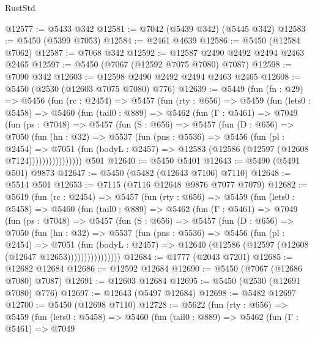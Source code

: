 \begin{lexlean}{RustStd}
\begin{coremodule}
@12577 := @5433 @342
@12581 := @7042 (@5439 @342) (@5445 @342)
@12583 := @5450 (@5399 @7053)
@12584 := @2461 @4639
@12586 := @5450 (@12584 @7062)
@12587 := @7068 @342
@12592 := @12587 @2490 @2492 @2494 @2463 @2465
@12597 := @5450 (@7067 (@12592 @7075 @7080) @7087)
@12598 := @7090 @342
@12603 := @12598 @2490 @2492 @2494 @2463 @2465
@12608 := @5450 (@2530 (@12603 @7075 @7080) @776)
@12639 := @5449
    (fun (fn : @29) =>
    @5456
      (fun (rc : @2454) =>
      @5457
        (fun (rty : @656) =>
        @5459
          (fun (lets0 : @5458) =>
          @5460
            (fun (tail0 : @889) =>
            @5462
              (fun (Γ : @5461) =>
              @7049
                (fun (ps : @7048) =>
                @5457
                  (fun (S : @656) =>
                  @5457
                    (fun (D : @656) =>
                    @7050
                      (fun (hn : @32) =>
                      @5537
                        (fun (pns : @5536) =>
                        @5456
                          (fun (pl : @2454) =>
                          @7051
                            (fun (bodyL : @2457) =>
                            @12583 (@12586 (@12597 (@12608 @7124))))))))))))))))
    @501
@12640 := @5450 @5401
@12643 := @5490 (@5491 @501) @9873
@12647 := @5450 (@5482 (@12643 @7106) @7110)
@12648 := @5514 @501
@12653 := @7115 (@7116 @12648 @9876 @7077 @7079)
@12682 := @5619
    (fun (rc : @2454) =>
    @5457
      (fun (rty : @656) =>
      @5459
        (fun (lets0 : @5458) =>
        @5460
          (fun (tail0 : @889) =>
          @5462
            (fun (Γ : @5461) =>
            @7049
              (fun (ps : @7048) =>
              @5457
                (fun (S : @656) =>
                @5457
                  (fun (D : @656) =>
                  @7050
                    (fun (hn : @32) =>
                    @5537
                      (fun (pns : @5536) =>
                      @5456
                        (fun (pl : @2454) =>
                        @7051
                          (fun (bodyL : @2457) =>
                          @12640 (@12586 (@12597 (@12608 (@12647 @12653))))))))))))))))
@12684 := @1777 (@2043 @7201)
@12685 := @12682 @12684
@12686 := @12592 @12684
@12690 := @5450 (@7067 (@12686 @7080) @7087)
@12691 := @12603 @12684
@12695 := @5450 (@2530 (@12691 @7080) @776)
@12697 := @12643 (@5497 @12684)
@12698 := @5482 @12697
@12700 := @5450 (@12698 @7110)
@12728 := @5622
    (fun (rty : @656) =>
    @5459
      (fun (lets0 : @5458) =>
      @5460
        (fun (tail0 : @889) =>
        @5462
          (fun (Γ : @5461) =>
          @7049

\end{coremodule}
\end{lexlean}
